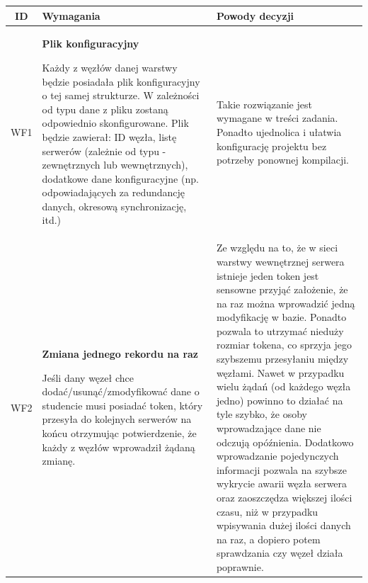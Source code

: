 \begin{tabularx}{\textwidth}{|c|X|X|}
\hline
\textbf{ID} & \textbf{Wymagania}  & \textbf{Powody decyzji} \\
\hline

\label{z:WF1} WF1 & \textbf{Plik konfiguracyjny}


Każdy z węzłów danej warstwy będzie posiadała plik konfiguracyjny o tej samej strukturze. W zależności od typu dane z pliku zostaną odpowiednio skonfigurowane. Plik będzie zawierał: ID węzła, listę serwerów (zależnie od typu - zewnętrznych lub wewnętrznych), dodatkowe dane konfiguracyjne (np. odpowiadających za redundancję danych, okresową synchronizację, itd.) &
Takie rozwiązanie jest wymagane w treści zadania. Ponadto ujednolica i ułatwia konfigurację projektu bez potrzeby ponownej kompilacji.\\
\hline

\label{z:WF2} WF2 &  \textbf{Zmiana jednego rekordu na raz }

Jeśli dany węzeł chce dodać/usunąć/zmodyfikować dane o studencie musi posiadać token, który przesyła do kolejnych serwerów na końcu otrzymując potwierdzenie, że każdy z węzłów wprowadził żądaną zmianę. & 
Ze względu na to, że w sieci warstwy wewnętrznej serwera istnieje jeden token jest sensowne przyjąć założenie, że na raz można wprowadzić jedną modyfikację w bazie. Ponadto pozwala to utrzymać nieduży rozmiar tokena, co sprzyja jego szybszemu przesyłaniu między węzłami. Nawet w przypadku wielu żądań (od każdego węzła jedno) powinno to działać na tyle szybko, że osoby wprowadzające dane nie odczują opóźnienia. Dodatkowo wprowadzanie pojedynczych informacji pozwala na szybsze wykrycie awarii węzła serwera oraz zaoszczędza większej ilości czasu, niż w przypadku wpisywania dużej ilości danych na raz, a dopiero potem sprawdzania czy węzeł działa poprawnie. \\
\hline

\end{tabularx}
\newpage
